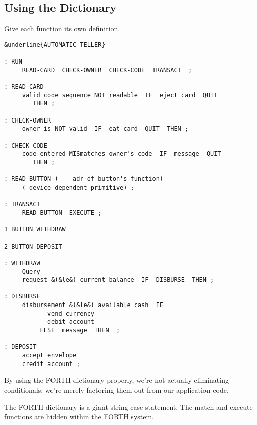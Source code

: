 \subsection{Using the Dictionary}

\begin{tip}
Give each function its own definition.
\end{tip}
\begin{figure*}[tp]
\begin{center}
\small\begin{BVerbatim}[commandchars=\&\{\}]
&underline{AUTOMATIC-TELLER}

: RUN
     READ-CARD  CHECK-OWNER  CHECK-CODE  TRANSACT  ;

: READ-CARD
     valid code sequence NOT readable  IF  eject card  QUIT
        THEN ;

: CHECK-OWNER
     owner is NOT valid  IF  eat card  QUIT  THEN ;

: CHECK-CODE
     code entered MISmatches owner's code  IF  message  QUIT
        THEN ;

: READ-BUTTON ( -- adr-of-button's-function)
     ( device-dependent primitive) ;

: TRANSACT
     READ-BUTTON  EXECUTE ;

1 BUTTON WITHDRAW

2 BUTTON DEPOSIT

: WITHDRAW
     Query
     request &(&le&) current balance  IF  DISBURSE  THEN ;

: DISBURSE
     disbursement &(&le&) available cash  IF
            vend currency
            debit account
          ELSE  message  THEN  ;

: DEPOSIT
     accept envelope
     credit account ;
\end{BVerbatim}
\end{center}
\end{figure*}

By using the FORTH dictionary properly, we're not actually eliminating
conditionals; we're merely factoring them out from our application code.

The FORTH dictionary is a giant string case statement. The match and
execute functions are hidden within the FORTH system.

